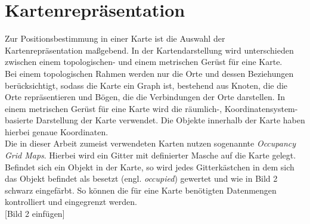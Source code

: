 \section{Kartenrepräsentation}\label{sec:Kartenrepräsentation}
Zur Positionsbestimmung in einer Karte ist die Auswahl der Kartenrepräsentation maßgebend. In der Kartendarstellung wird unterschieden zwischen einem topologischen- und einem metrischen Gerüst für eine Karte.\\
Bei einem topologischen Rahmen werden nur die Orte und dessen Beziehungen berücksichtigt, sodass die Karte ein Graph ist, bestehend aus Knoten, die die Orte repräsentieren und Bögen, die die Verbindungen der Orte darstellen. In einem metrischen Gerüst für eine Karte wird die räumlich-, Koordinatensystem-basierte Darstellung der Karte verwendet. Die Objekte innerhalb der Karte haben hierbei genaue Koordinaten.\\
Die in dieser Arbeit zumeist verwendeten Karten nutzen sogenannte \textit{Occupancy Grid Maps}. Hierbei wird ein Gitter mit definierter Masche auf die Karte gelegt. Befindet sich ein Objekt in der Karte, so wird jedes Gitterkästchen in dem sich das Objekt befindet als besetzt (engl. \textit{occupied}) gewertet und wie in Bild 2 schwarz eingefärbt. So können die für eine Karte benötigten Datenmengen kontrolliert und eingegrenzt werden.\\

[Bild 2 einfügen]
